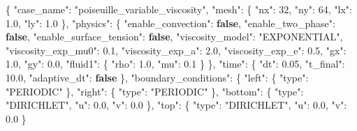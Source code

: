 \documentclass[
  french,
]{article}
\newenvironment{Shaded}{}{}
\newcommand{\DataTypeTok}[1]{\textcolor[rgb]{0.56,0.13,0.00}{#1}}
\newcommand{\DecValTok}[1]{\textcolor[rgb]{0.25,0.63,0.44}{#1}}
\newcommand{\FloatTok}[1]{\textcolor[rgb]{0.25,0.63,0.44}{#1}}
\newcommand{\FunctionTok}[1]{\textcolor[rgb]{0.02,0.16,0.49}{#1}}
\newcommand{\KeywordTok}[1]{\textcolor[rgb]{0.00,0.44,0.13}{\textbf{#1}}}
\newcommand{\StringTok}[1]{\textcolor[rgb]{0.25,0.44,0.63}{#1}}
\begin{document}
\begin{Shaded}
\begin{Highlighting}[]
\FunctionTok{\{}
  \DataTypeTok{"case\_name"}\FunctionTok{:} \StringTok{"poiseuille\_variable\_viscosity"}\FunctionTok{,}
  \DataTypeTok{"mesh"}\FunctionTok{:} \FunctionTok{\{} \DataTypeTok{"nx"}\FunctionTok{:} \DecValTok{32}\FunctionTok{,} \DataTypeTok{"ny"}\FunctionTok{:} \DecValTok{64}\FunctionTok{,} \DataTypeTok{"lx"}\FunctionTok{:} \FloatTok{1.0}\FunctionTok{,} \DataTypeTok{"ly"}\FunctionTok{:} \FloatTok{1.0} \FunctionTok{\},}
  \DataTypeTok{"physics"}\FunctionTok{:} \FunctionTok{\{}
    \DataTypeTok{"enable\_convection"}\FunctionTok{:} \KeywordTok{false}\FunctionTok{,}
    \DataTypeTok{"enable\_two\_phase"}\FunctionTok{:} \KeywordTok{false}\FunctionTok{,}
    \DataTypeTok{"enable\_surface\_tension"}\FunctionTok{:} \KeywordTok{false}\FunctionTok{,}
    \DataTypeTok{"viscosity\_model"}\FunctionTok{:} \StringTok{"EXPONENTIAL"}\FunctionTok{,}
    \DataTypeTok{"viscosity\_exp\_mu0"}\FunctionTok{:} \FloatTok{0.1}\FunctionTok{,}
    \DataTypeTok{"viscosity\_exp\_a"}\FunctionTok{:} \FloatTok{2.0}\FunctionTok{,}
    \DataTypeTok{"viscosity\_exp\_e"}\FunctionTok{:} \FloatTok{0.5}\FunctionTok{,}
    \DataTypeTok{"gx"}\FunctionTok{:} \FloatTok{1.0}\FunctionTok{,} \DataTypeTok{"gy"}\FunctionTok{:} \FloatTok{0.0}\FunctionTok{,}
    \DataTypeTok{"fluid1"}\FunctionTok{:} \FunctionTok{\{} \DataTypeTok{"rho"}\FunctionTok{:} \FloatTok{1.0}\FunctionTok{,} \DataTypeTok{"mu"}\FunctionTok{:} \FloatTok{0.1} \FunctionTok{\}}
  \FunctionTok{\},}
  \DataTypeTok{"time"}\FunctionTok{:} \FunctionTok{\{} \DataTypeTok{"dt"}\FunctionTok{:} \FloatTok{0.05}\FunctionTok{,} \DataTypeTok{"t\_final"}\FunctionTok{:} \FloatTok{10.0}\FunctionTok{,} \DataTypeTok{"adaptive\_dt"}\FunctionTok{:} \KeywordTok{false} \FunctionTok{\},}
  \DataTypeTok{"boundary\_conditions"}\FunctionTok{:} \FunctionTok{\{}
    \DataTypeTok{"left"}\FunctionTok{:}   \FunctionTok{\{} \DataTypeTok{"type"}\FunctionTok{:} \StringTok{"PERIODIC"} \FunctionTok{\},}
    \DataTypeTok{"right"}\FunctionTok{:}  \FunctionTok{\{} \DataTypeTok{"type"}\FunctionTok{:} \StringTok{"PERIODIC"} \FunctionTok{\},}
    \DataTypeTok{"bottom"}\FunctionTok{:} \FunctionTok{\{} \DataTypeTok{"type"}\FunctionTok{:} \StringTok{"DIRICHLET"}\FunctionTok{,} \DataTypeTok{"u"}\FunctionTok{:} \FloatTok{0.0}\FunctionTok{,} \DataTypeTok{"v"}\FunctionTok{:} \FloatTok{0.0} \FunctionTok{\},}
    \DataTypeTok{"top"}\FunctionTok{:}    \FunctionTok{\{} \DataTypeTok{"type"}\FunctionTok{:} \StringTok{"DIRICHLET"}\FunctionTok{,} \DataTypeTok{"u"}\FunctionTok{:} \FloatTok{0.0}\FunctionTok{,} \DataTypeTok{"v"}\FunctionTok{:} \FloatTok{0.0} \FunctionTok{\}}

\end{Highlighting}
\end{Shaded}
\end{document}
